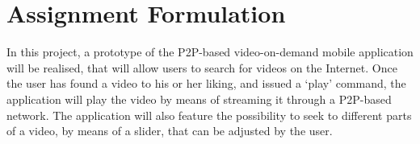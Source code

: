 \section{Assignment Formulation}
In this project, a prototype of the P2P-based video-on-demand mobile application will be realised, that will allow users to search for videos on the Internet. Once the user has found a video to his or her liking, and issued a ‘play’ command, the application will play the video by means of streaming it through a P2P-based network. The application will also feature the possibility to seek to different parts of a video, by means of a slider, that can be adjusted by the user.

